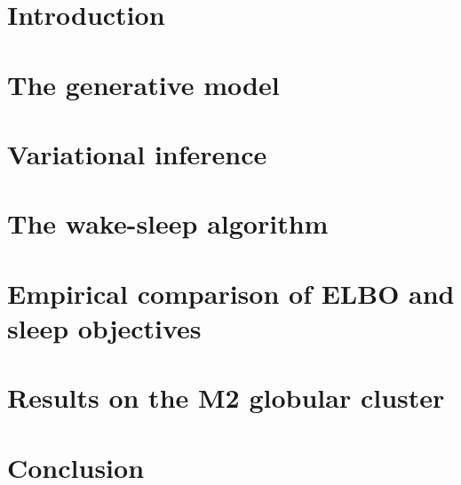 \documentclass[12pt]{article}
\begin{document}


\section{Introduction}
\label{sec:intro}


\section{The generative model}
\label{sec:gen_model}


\section{Variational inference}
\label{sec:var_inference}


\section{The wake-sleep algorithm}
\label{sec:wake_sleep}




\section{Empirical comparison of ELBO and sleep objectives}


\section{Results on the M2 globular cluster}


\section{Conclusion}
\label{sec:discussion}



% 



\newpage
\appendix

\renewcommand\thefigure{A.\arabic{figure}}
\renewcommand\thetable{A.\arabic{table}}
\setcounter{figure}{0}    
\setcounter{table}{0}    
\end{document}
